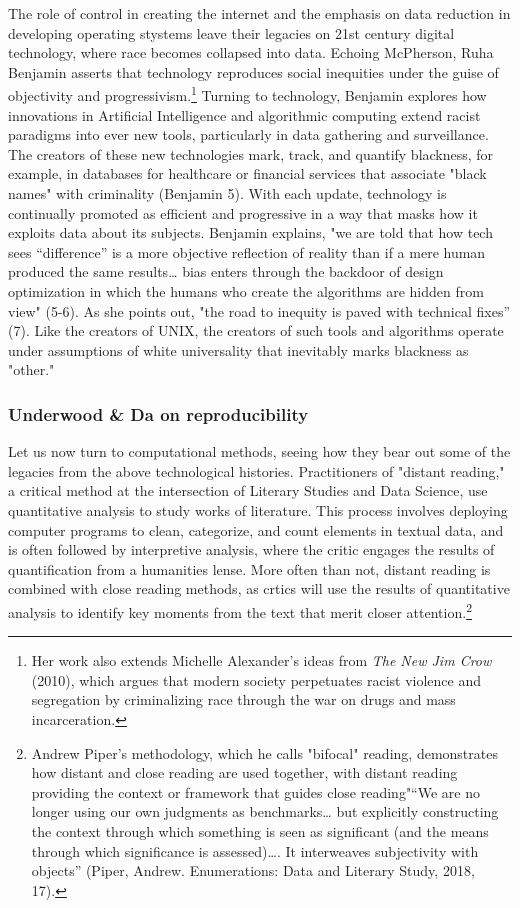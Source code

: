 \documentclass[11pt]{article}
\begin{document}
The role of control in creating the internet and the emphasis on data
reduction in developing operating stystems leave their legacies on
21st century digital technology, where race becomes collapsed into
data. Echoing McPherson, Ruha Benjamin asserts that technology
reproduces social inequities under the guise of objectivity and
progressivism.\footnote{Her work also extends Michelle Alexander's ideas from \emph{The New
Jim Crow} (2010), which argues that modern society perpetuates racist
violence and segregation by criminalizing race through the war on
drugs and mass incarceration.} Turning to technology, Benjamin explores how
innovations in Artificial Intelligence and algorithmic computing
extend racist paradigms into ever new tools, particularly in data
gathering and surveillance. The creators of these new technologies
mark, track, and quantify blackness, for example, in databases for
healthcare or financial services that associate "black names" with
criminality (Benjamin 5). With each update, technology is continually
promoted as efficient and progressive in a way that masks how it
exploits data about its subjects. Benjamin explains, "we are told that
how tech sees “difference” is a more objective reflection of reality
than if a mere human produced the same results\ldots{} bias enters through
the backdoor of design optimization in which the humans who create the
algorithms are hidden from view" (5-6). As she points out, "the road
to inequity is paved with technical fixes” (7). Like the creators of
UNIX, the creators of such tools and algorithms operate under
assumptions of white universality that inevitably marks blackness as
"other."

\subsubsection{Underwood \& Da on reproducibility}
\label{sec:org8ba9614}

Let us now turn to computational methods, seeing how they bear out
some of the legacies from the above technological
histories. Practitioners of "distant reading," a critical method at
the intersection of Literary Studies and Data Science, use
quantitative analysis to study works of literature. This process
involves deploying computer programs to clean, categorize, and count
elements in textual data, and is often followed by interpretive
analysis, where the critic engages the results of quantification from
a humanities lense. More often than not, distant reading is combined
with close reading methods, as crtics will use the results of
quantitative analysis to identify key moments from the text that merit
closer attention.\footnote{Andrew Piper's methodology, which he calls "bifocal" reading,
demonstrates how distant and close reading are used together, with
distant reading providing the context or framework that guides close
reading"“We are no longer using our own judgments as benchmarks\ldots{} but
explicitly constructing the context through which something is seen as
significant (and the means through which significance is
assessed)\ldots{}. It interweaves subjectivity with objects” (Piper,
Andrew. Enumerations: Data and Literary Study, 2018, 17).}
\end{document}
